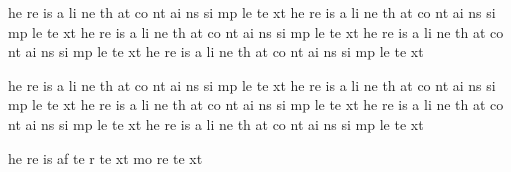 he
re
is
a
li
ne
th
at
co
nt
ai
ns
si
mp
le
te
xt
he
re
is
a
li
ne
th
at
co
nt
ai
ns
si
mp
le
te
xt
he
re
is
a
li
ne
th
at
co
nt
ai
ns
si
mp
le
te
xt
he
re
is
a
li
ne
th
at
co
nt
ai
ns
si
mp
le
te
xt
he
re
is
a
li
ne
th
at
co
nt
ai
ns
si
mp
le
te
xt %

he
re
is
a
li
ne
th
at
co
nt
ai
ns
si
mp
le
te
xt
he
re
is
a
li
ne
th
at
co
nt
ai
ns
si
mp
le
te
xt
he
re
is
a
li
ne
th
at
co
nt
ai
ns
si
mp
le
te
xt
he
re
is
a
li
ne
th
at
co
nt
ai
ns
si
mp
le
te
xt
he
re
is
a
li
ne
th
at
co
nt
ai
ns
si
mp
le
te
xt%

he
re
is
af
te
r
te
xt
mo
re
te
xt%
